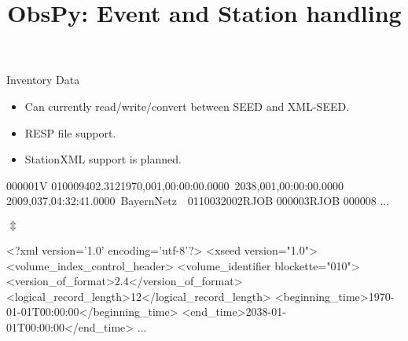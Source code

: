 
\title{ObsPy: Event and Station handling}


\frame[plain]{\titlepage}



\begin{frame}{Inventory Data}
    \begin{itemize}
        \item Can currently read/write/convert between SEED and XML-SEED.
        \item RESP file support.
        \item StationXML support is planned.
    \end{itemize}


\footnotesize
\begin{myColorBox}{0.95}{}
\begin{semiverbatim}
000001V 010009402.3121970,001,00:00:00.0000~2038,001,00:00:00.0000~
2009,037,04:32:41.0000~BayernNetz~~0110032002RJOB 000003RJOB 000008
...
\end{semiverbatim}
\end{myColorBox}

\large
\begin{center}
    $\Updownarrow$
\end{center}

\footnotesize


\begin{myColorBox}{0.95}{}
\begin{semiverbatim}
<?xml version='1.0' encoding='utf-8'?>
<xseed version="1.0">
  <volume_index_control_header>
    <volume_identifier blockette="010">
      <version_of_format>2.4</version_of_format>
      <logical_record_length>12</logical_record_length>
      <beginning_time>1970-01-01T00:00:00</beginning_time>
      <end_time>2038-01-01T00:00:00</end_time>
...
\end{semiverbatim}
\end{myColorBox}

\normalsize

\end{frame}

